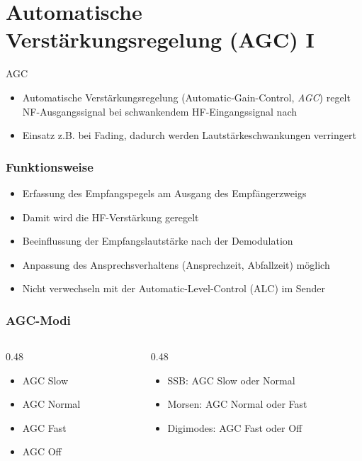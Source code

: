 
\section{Automatische Verstärkungsregelung (AGC) I}
\label{section:agc_1}
\begin{frame}{AGC}
    \begin{center}
    \end{center}
    \begin{itemize}
        \item Automatische Verstärkungsregelung (Automatic-Gain-Control, \emph{AGC}) regelt NF-Ausgangssignal bei schwankendem HF-Eingangssignal nach
        \item Einsatz z.B. bei Fading, dadurch werden Lautstärkeschwankungen verringert
    \end{itemize}
\end{frame}

\begin{frame}
    \frametitle{Funktionsweise}
    \begin{itemize}
        \item Erfassung des Empfangspegels am Ausgang des Empfängerzweigs
        \item Damit wird die HF-Verstärkung geregelt
        \item Beeinflussung der Empfangslautstärke nach der Demodulation
        \item Anpassung des Ansprechsverhaltens (Ansprechzeit, Abfallzeit) möglich
        \item Nicht verwechseln mit der Automatic-Level-Control (ALC) im Sender
    \end{itemize}
\end{frame}

\begin{frame}
    \frametitle{AGC-Modi}
    \begin{columns}
        \begin{column}{0.48\textwidth}
            \begin{itemize}
                \item AGC Slow
                \item AGC Normal
                \item AGC Fast
                \item AGC Off
            \end{itemize}

        \end{column}
        \begin{column}{0.48\textwidth}
            \begin{itemize}
                \item SSB: AGC Slow oder Normal
                \item Morsen: AGC Normal oder Fast
                \item Digimodes: AGC Fast oder Off
            \end{itemize}

        \end{column}
    \end{columns}

\end{frame}

